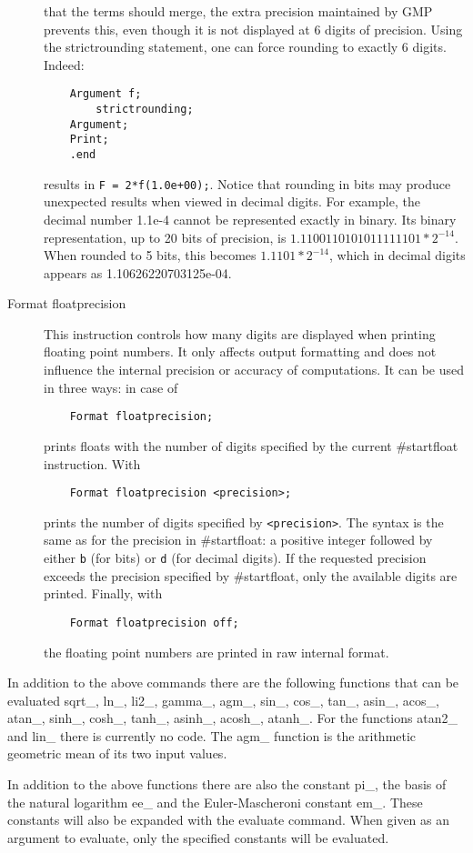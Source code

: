 \begin{description}
that the terms should merge, the extra precision maintained by GMP 
prevents this, even though it is not displayed at 6 digits of 
precision. Using the strictrounding statement, one can force rounding 
to exactly 6 digits. Indeed:
\begin{verbatim}
    Argument f;
        strictrounding;
    Argument;
    Print;
    .end
\end{verbatim}
results in \texttt{F = 2*f(1.0e+00);}.
Notice that rounding in bits may produce unexpected results when viewed 
in decimal digits. For example, the decimal number 1.1e-4 cannot be 
represented exactly in binary. Its binary representation, up to 20 bits of precision, is 
$1.1100110101011111101*2^{-14}$. When rounded to 5 bits, this becomes 
$1.1101*2^{-14}$, which in decimal digits appears as 
1.10626220703125e-04.
\item[Format floatprecision] This instruction controls how many digits are 
displayed when printing floating point numbers. It only affects output 
formatting and does not influence the internal precision or accuracy of 
computations. It can be used in three ways: in case of 
\begin{verbatim}
    Format floatprecision;
\end{verbatim}
\FORM{} prints floats with the number of digits specified by the current 
\#startfloat instruction. With
\begin{verbatim}
    Format floatprecision <precision>;
\end{verbatim}
\FORM{} prints the number of digits specified by \texttt{<precision>}. 
The syntax is the same as for the precision in \#startfloat: a positive 
integer followed by either \texttt{b} (for bits) or \texttt{d} (for decimal 
digits). If the requested precision exceeds the precision specified by 
\#startfloat, only the available digits are printed. Finally, with 
\begin{verbatim}
    Format floatprecision off;
\end{verbatim}
the floating point numbers are printed in raw internal format. 
\end{description}
In addition to the above commands there are the following functions that 
can be evaluated sqrt\_, ln\_, li2\_, gamma\_, agm\_, sin\_, cos\_, tan\_,
asin\_, acos\_, atan\_, sinh\_, cosh\_, tanh\_, asinh\_, acosh\_, atanh\_.
For the functions atan2\_ and lin\_ there is currently no code.
The agm\_ function is the arithmetic geometric mean of its two input 
values.

In addition to the above functions there are also the constant 
pi\_, the basis of the natural logarithm ee\_ and the 
Euler-Mascheroni constant em\_. These constants will also be 
expanded with the evaluate command. When given as an argument to evaluate, 
only the specified constants will be evaluated.


